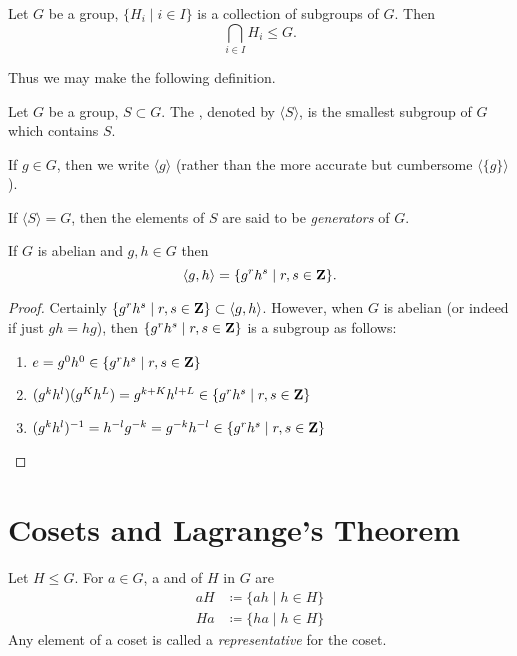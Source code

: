 \begin{corollary}
Let $G$ be a group, $\{H_i\mid i\in I\}$ is a collection of subgroups of $G$. Then
\[\bigcap_{i\in I}H_i\le G.\]
\end{corollary}

Thus we may make the following definition.
\begin{definition}
Let $G$ be a group, $S\subset G$. The , denoted by $\langle S\rangle$, is the smallest subgroup of $G$ which contains $S$.

If $g\in G$, then we write $\langle g\rangle$ (rather than the more accurate but cumbersome $\langle\{g\}\rangle$).

If $\langle S\rangle=G$, then the elements of $S$ are said to be \emph{generators} of $G$.
\end{definition}

\begin{example}
If $G$ is abelian and $g,h\in G$ then
\[\langle g,h\rangle=\{g^rh^s\mid r,s\in\mathbf Z\}.\]
\begin{proof}
Certainly $\{g^rh^s\mid r,s\in\mathbf Z\}\subset\langle g,h\rangle$. However, when $G$ is abelian (or indeed if just $gh=hg$), then $\{g^rh^s\mid r,s\in\mathbf Z\}$ is a subgroup as follows:
\begin{enumerate}[label=(\roman*)]
\item $e=g^0h^0\in\{g^rh^s\mid r,s\in\mathbf Z\}$
\item $(g^kh^l)(g^Kh^L)=g^{k+K}h^{l+L}\in\{g^rh^s\mid r,s\in\mathbf Z\}$
\item $(g^kh^l)^{-1}=h^{-l}g^{-k}=g^{-k}h^{-l}\in\{g^rh^s\mid r,s\in\mathbf Z\}$
\end{enumerate}
\end{proof}
\end{example}
\pagebreak

\section{Cosets and Lagrange's Theorem}
\begin{definition}[Coset]
Let $H\le G$. For $a\in G$, a  and  of $H$ in $G$ are
\begin{align*}
aH&\coloneqq\{ah\mid h\in H\}\\
Ha&\coloneqq\{ha\mid h\in H\}
\end{align*}
Any element of a coset is called a \emph{representative} for the coset.
\end{definition}

